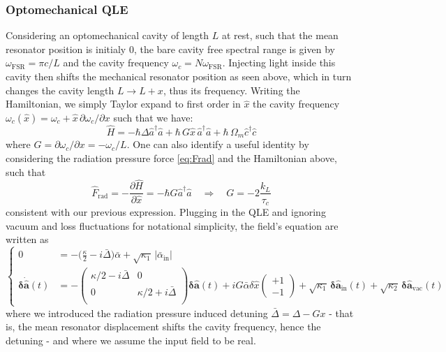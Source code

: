 \subsubsection{Optomechanical QLE}
Considering an optomechanical cavity of length $L$ at rest, such that the mean resonator position is initialy 0, the bare cavity free spectral range is given by $\omega_{\mathrm{FSR}}=\pi c /L$ and the cavity frequency $\omega_c = N \omega_{\mathrm{FSR}}$. Injecting light inside this cavity then shifts the mechanical resonator position as seen above, which in turn changes the cavity length $L \rightarrow L+x$, thus its frequency. Writing the Hamiltonian, we simply Taylor expand to first order in $\hat{x}$ the cavity frequency $\omega_c(\hat{x})=\omega_c + \hat x \, \partial \omega_c / \partial x$ such that we have: 
\begin{equation}
\hat{H} = - \hbar \Delta  \hat{a}^\dagger \hat{a} + \hbar \, G  \hat{x} \, \hat{a}^{\dagger} \hat{a} + \hbar \, \Omega_m \hat{c}^\dagger \hat{c}
\end{equation}
where $G=  \partial \omega_c / \partial x = - \omega_c/L$. One can also identify a useful identity by considering the radiation pressure force \eqref{eq:Frad} and the Hamiltonian above, such that
\begin{equation}
  \hat F_{\textrm{rad}} = - \frac{\partial \hat H}{\partial \hat x} = - \hbar G \hat{a}^\dagger \hat{a} \quad \Rightarrow \quad G = - 2 \frac{k_L}{\tau_c}
\end{equation}
consistent with our previous expression.
Plugging in the QLE and ignoring vacuum and loss fluctuations for notational simplicity, the field's equation are written as 
\begin{equation}
  \left\{
  \begin{split}
  0 &= -\Big(\frac{\kappa}{2}-i\bar\Delta\Big) \bar{\alpha} + \sqrt{\kappa_1} \, |\bar{\alpha}_{\mathrm{in}}| \\
  \mathbf{\delta \dot{\hat{a}}}(t)&= - \begin{pmatrix}
  \kappa/2-i\bar\Delta & 0 \\ 
   0 &\kappa/2+i\bar\Delta \\ 
  \end{pmatrix}  \mathbf{\delta \hat{a}}(t) + iG\bar{\alpha}\delta \hat{x} \begin{pmatrix} +1 \\ -1\end{pmatrix}  +  \sqrt{\kappa_{\mathrm{1}}} \, \mathbf{\delta \hat{a}_{\mathrm{in}}}(t)  + \sqrt{\kappa_2} \, \mathbf{\delta \hat{a}_{\mathrm{vac}}}(t) 
  \end{split}
  \right.
\end{equation}
where we introduced the radiation pressure induced detuning $\bar\Delta = \Delta - G x$ - that is, the mean resonator displacement shifts the cavity frequency, hence the detuning - and where we assume the input field to be real. 

